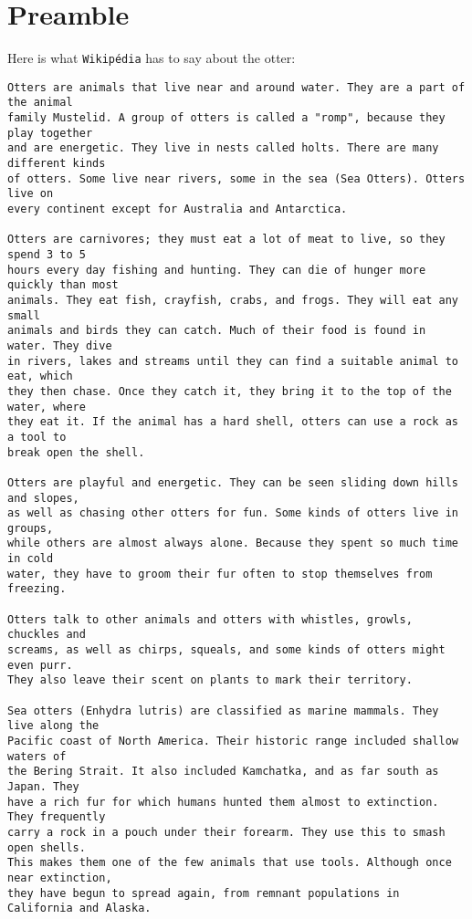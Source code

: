 \documentclass{42-en}
\begin{document}
\chapter{Preamble}

Here is what \texttt{Wikipédia} has to say about the otter:

\begin{verbatim}
Otters are animals that live near and around water. They are a part of the animal 
family Mustelid. A group of otters is called a "romp", because they play together 
and are energetic. They live in nests called holts. There are many different kinds 
of otters. Some live near rivers, some in the sea (Sea Otters). Otters live on
every continent except for Australia and Antarctica.

Otters are carnivores; they must eat a lot of meat to live, so they spend 3 to 5 
hours every day fishing and hunting. They can die of hunger more quickly than most
animals. They eat fish, crayfish, crabs, and frogs. They will eat any small
animals and birds they can catch. Much of their food is found in water. They dive
in rivers, lakes and streams until they can find a suitable animal to eat, which
they then chase. Once they catch it, they bring it to the top of the water, where
they eat it. If the animal has a hard shell, otters can use a rock as a tool to
break open the shell.

Otters are playful and energetic. They can be seen sliding down hills and slopes,
as well as chasing other otters for fun. Some kinds of otters live in groups,
while others are almost always alone. Because they spent so much time in cold
water, they have to groom their fur often to stop themselves from freezing.

Otters talk to other animals and otters with whistles, growls, chuckles and
screams, as well as chirps, squeals, and some kinds of otters might even purr.
They also leave their scent on plants to mark their territory.

Sea otters (Enhydra lutris) are classified as marine mammals. They live along the
Pacific coast of North America. Their historic range included shallow waters of
the Bering Strait. It also included Kamchatka, and as far south as Japan. They
have a rich fur for which humans hunted them almost to extinction. They frequently
carry a rock in a pouch under their forearm. They use this to smash open shells.
This makes them one of the few animals that use tools. Although once near extinction,
they have begun to spread again, from remnant populations in California and Alaska.

\end{verbatim}
\end{document}
